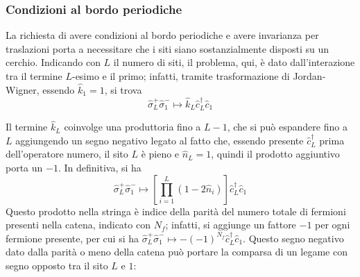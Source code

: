 \documentclass[11pt, a4paper]{scrartcl}
\theoremstyle{style}
\theoremstyle{style1}
\numberwithin{equation}{subsection}
\begin{document}
\subsubsection{Condizioni al bordo periodiche}
\begin{center}
	\begin{minipage}
		{.55\columnwidth}
	La richiesta di avere condizioni al bordo periodiche e avere invarianza per traslazioni porta a necessitare che i siti siano sostanzialmente disposti su un cerchio.
	Indicando con $L$ il numero di siti, il problema, qui, \`e dato dall'interazione tra il termine $L$-esimo e il primo; infatti, tramite trasformazione di Jordan-Wigner, essendo $\hat{k}_1 = 1$, si trova 
	\[
	\hat{\sigma }^+_L \hat{\sigma }^-_1 \longmapsto \hat{k}_L \hat{c}^\dagger _L \hat{c}_1
	\] 
	\end{minipage}
	\hfill
	\begin{minipage}
		{.4\columnwidth}
	\centering
	\end{minipage}
\end{center}
Il termine $\hat{k}_L$ coinvolge una produttoria fino a $L-1$, che si pu\`o espandere fino a $L$ aggiungendo un segno negativo legato al fatto che, essendo presente $\hat{c}^\dagger _L$ prima dell'operatore numero, il sito $L$ \`e pieno e $\hat{n}_L = 1$, quindi il prodotto aggiuntivo porta un $-1$.
In definitiva, si ha
\[
\hat{\sigma }_L^+ \hat{\sigma }_1 ^ - \longmapsto \left[ \prod_{i=1} ^L \left(1-2\hat{n}_i\right)  \right] \hat{c}^\dagger _L \hat{c}_1
\] 
Questo prodotto nella stringa \`e indice della parit\`a del numero totale di fermioni presenti nella catena, indicato con $N_f$; infatti, si aggiunge un fattore $-1$ per ogni fermione presente, per cui si ha $\hat{\sigma }_L^+ \hat{\sigma }_1 ^ - \longmapsto - (-1)^{N_f} \hat{c}^\dagger _L \hat{c}_1$.
Questo segno negativo dato dalla parit\`a o meno della catena pu\`o portare la comparsa di un legame con segno opposto tra il sito $L$ e $1$:
\end{document}
